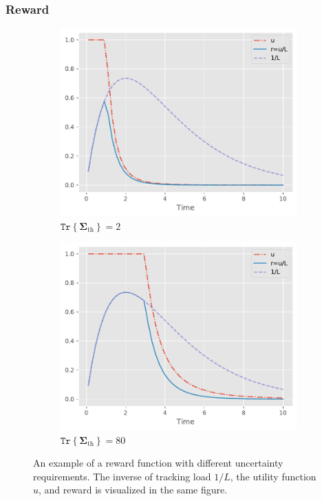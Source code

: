 \documentclass[english, 12pt, a4paper, elec, utf8, a-1b, online]{aaltothesis}
\newcommand{\tr}[1]{\texttt{Tr}\left\{ #1 \right\}}
\newcommand{\priorecovth}{\bm{\Sigma}_{\text{th}}}
\begin{document}
\subsubsection{Reward} \label{sec:rewards}

\begin{figure}[h]
    \centering
    \begin{subfigure}[b]{0.45\textwidth}
        \centering
        \includegraphics[width=\textwidth]{figures/reward.pdf}
        \caption{ $\tr{\priorecovth} = 2$}
    \end{subfigure}
    \begin{subfigure}[b]{0.45\textwidth}
        \centering
        \includegraphics[width=\textwidth]{figures/reward2.pdf}
        \caption{ $\tr{\priorecovth} = 80$}
    \end{subfigure}
    \caption{An example of a reward function with different uncertainty requirements.
    The inverse of tracking load $1/L$, the utility function $u$, and reward is visualized in the same figure. }
    \label{fig:my_label}
\end{figure}
\end{document}
